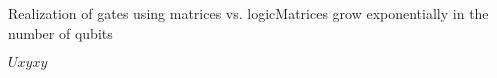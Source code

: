 {\begin{frame}{Realization of gates using matrices vs. logic}{Matrices grow exponentially in the number of qubits}
{\begin{center}
\begin{UTable}{$U$}{\alert<7>{$x$}}{$y$}{}{\alert<7>{$x$}}{$y$}
\end{UTable}\end{center}
\begin{center}
\begin{GateBox}[scale=1.0]{2}{1}{2}
\end{GateBox}
\end{center}
    }
\end{frame}
}
